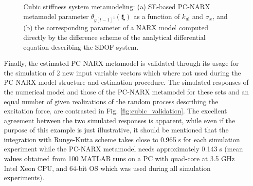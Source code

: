 \documentclass[preprint,3p,review,times,11pt]{elsarticle}
\newcommand{\bld}[1]{\boldsymbol{#1}}
\newcommand{\bxi}{\bld{\xi}}
\begin{document}
\begin{figure}[t!]
\caption{Cubic stiffness system metamodeling: (a) SE-based PC-NARX metamodel parameter $\theta_{y[t-1]^3}(\bxi)$ as a function of $k_{\mathrm{nl}}$ and $\sigma_x$, and (b) the corresponding parameter of a NARX model computed directly by the difference scheme of the analytical differential equation describing the SDOF system.
\label{fig:cubic_surfs}}
\end{figure}



Finally, the estimated PC-NARX metamodel is validated through its usage for the simulation of 2 new input variable vectors which where not used during the PC-NARX model structure and estimation procedure. The simulated responses of the numerical model and those of the PC-NARX metamodel for these sets and an equal number of given realizations of the random process describing the excitation force, are contrasted in Fig. \ref{fig:cubic_validation}. The excellent agreement between the two simulated responses is apparent, while even if the purpose of this example is just illustrative, it should be mentioned that the integration with Runge-Kutta scheme takes close to 0.965 s for each simulation experiment while the PC-NARX metamodel needs approximately 0.143 s (mean values obtained from 100 MATLAB runs on a PC with quad-core at 3.5 GHz Intel Xeon CPU, and 64-bit OS which was used during all simulation experiments).
\end{document}
